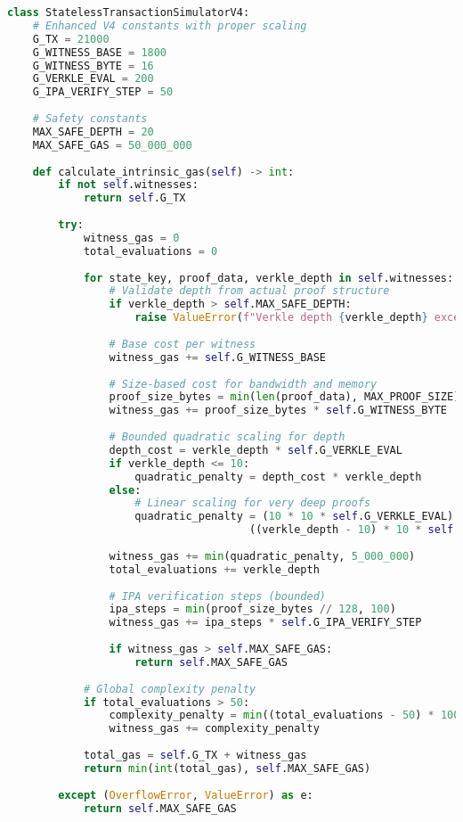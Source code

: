 \documentclass{article}
\begin{document}
\begin{lstlisting}[language=Python,caption={V4 Gas Calculation with Overflow Protection},label={lst:gas}]
class StatelessTransactionSimulatorV4:
    # Enhanced V4 constants with proper scaling
    G_TX = 21000
    G_WITNESS_BASE = 1800
    G_WITNESS_BYTE = 16
    G_VERKLE_EVAL = 200
    G_IPA_VERIFY_STEP = 50
    
    # Safety constants
    MAX_SAFE_DEPTH = 20
    MAX_SAFE_GAS = 50_000_000
    
    def calculate_intrinsic_gas(self) -> int:
        if not self.witnesses:
            return self.G_TX
        
        try:
            witness_gas = 0
            total_evaluations = 0
            
            for state_key, proof_data, verkle_depth in self.witnesses:
                # Validate depth from actual proof structure
                if verkle_depth > self.MAX_SAFE_DEPTH:
                    raise ValueError(f"Verkle depth {verkle_depth} exceeds safe maximum")
                
                # Base cost per witness
                witness_gas += self.G_WITNESS_BASE
                
                # Size-based cost for bandwidth and memory
                proof_size_bytes = min(len(proof_data), MAX_PROOF_SIZE)
                witness_gas += proof_size_bytes * self.G_WITNESS_BYTE
                
                # Bounded quadratic scaling for depth
                depth_cost = verkle_depth * self.G_VERKLE_EVAL
                if verkle_depth <= 10:
                    quadratic_penalty = depth_cost * verkle_depth
                else:
                    # Linear scaling for very deep proofs
                    quadratic_penalty = (10 * 10 * self.G_VERKLE_EVAL) + \
                                      ((verkle_depth - 10) * 10 * self.G_VERKLE_EVAL)
                
                witness_gas += min(quadratic_penalty, 5_000_000)
                total_evaluations += verkle_depth
                
                # IPA verification steps (bounded)
                ipa_steps = min(proof_size_bytes // 128, 100)
                witness_gas += ipa_steps * self.G_IPA_VERIFY_STEP
                
                if witness_gas > self.MAX_SAFE_GAS:
                    return self.MAX_SAFE_GAS
            
            # Global complexity penalty
            if total_evaluations > 50:
                complexity_penalty = min((total_evaluations - 50) * 1000, 1_000_000)
                witness_gas += complexity_penalty
            
            total_gas = self.G_TX + witness_gas
            return min(int(total_gas), self.MAX_SAFE_GAS)
            
        except (OverflowError, ValueError) as e:
            return self.MAX_SAFE_GAS
\end{lstlisting}
\end{document}
